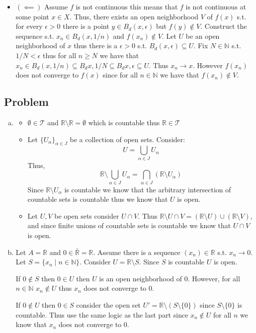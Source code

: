 \documentclass[12pt, letterpaper]{article}
\newcounter{problem}
\newcommand{\q}{
    \newpage %
    \stepcounter{problem} %
    \subsection*{Problem \arabic{problem}} %
}
\newcommand{\R}{\mathbb{R}}
\newcommand{\N}{\mathbb{N}}
\newcommand{\T}{\mathcal{T}}
\begin{document}
\begin{enumerate}[(a)]
\begin{itemize}
        \item $(\impliedby)$ Assume $f$ is not continuous this means that $f$ is not continuous at some point $x \in X$. Thus, there exists an open neighborhood $V$ of $f(x)$ s.t. for every $\epsilon>0$ there is a point $y \in B_d(x,\epsilon)$ but $f(y) \notin V$.
        Construct the sequence s.t. $x_n \in B_d(x,1/n)$ and $f(x_n) \notin V$. Let $U$ be an open neighborhood of $x$ thus there is a $\epsilon>0$ s.t. $B_d(x,\epsilon) \subseteq U$. Fix $N \in \N$ s.t. $1/N < \epsilon$ thus for all $n \geq N$ we have that $x_n \in B_d(x,1/n) \subseteq B_d{x,1/N} \subseteq B_d{x,\epsilon} \subseteq U$. Thus $x_n \to x$. However $f(x_n)$ does not converge to $f(x)$ since for all $n \in \N$ we have that $f(x_n) \notin V$.
    \end{itemize}
\end{enumerate}

\q
\begin{enumerate}[(a)]
    \item \begin{itemize}
        \item $\emptyset \in \T$ and $\R \setminus \R = \emptyset$ which is countable thus $\R \in \T$
    
        \item Let $\{U_\alpha\}_{\alpha \in J}$ be a collection of open sets. Consider:
        \[U=\bigcup_{\alpha \in J}U_\alpha\]
        Thus,
        \[\R \setminus \bigcup_{\alpha \in J}U_\alpha= \bigcap_{\alpha \in J}(\R \setminus U_\alpha)\]
        Since $\R\setminus U_\alpha$ is countable we know that the arbitrary intersection of countable sets is countable thus we know that $U$ is open.
        
        \item Let $U,V$ be open sets consider $U \cap V$. Thus $\R \setminus U \cap V = (\R \setminus U) \cup (\R \setminus V)$, and since finite unions of countable sets is countable we know that $U \cap V$ is open.
    \end{itemize}

    \item Let $A=\R$ and $0 \in \bar{\R}=\R$. Assume there is a sequence $(x_n) \in \R$ s.t. $x_n \to 0$. Let $S=\{x_n \mid n \in \N\}$. Consider $U=\R \setminus S$. Since $S$ is countable $U$ is open.
    
    If $0 \notin S$ then $0 \in U$ then $U$ is an open neighborhood of $0$. However, for all $n \in \N$ $x_n \notin U$ thus $x_n$ does not converge to 0.

    If $0 \notin U$ then $0 \in S$ consider the open set $U'=\R \setminus(S \setminus \{0\})$ since $S \setminus \{0\}$ is countable. Thus use the same logic as the last part since $x_n \notin U$ for all $n$ we know that $x_n$ does not converge to 0.
\end{enumerate}
\end{document}
